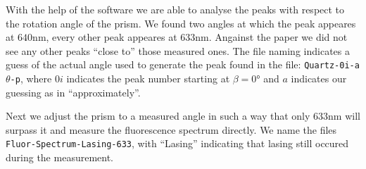 \documentclass[../../main.tex]{subfiles}
\begin{document}
        With the help of the software we are able to analyse the peaks with respect to the rotation angle of the prism. We found two angles at which the peak appeares at $640\si{\nm}$, every other peak appeares at $633\si{\nm}$. Angainst the paper we did not see any other peaks \enquote{close to} those measured ones. The file naming indicates a guess of the actual angle used to generate the peak found in the file: \texttt{Quartz-0i-a}$\theta$\texttt{-p}, where $0i$ indicates the peak number starting at $\beta=0\si{\degree}$ and $a$ indicates our guessing as in \enquote{approximately}. 

        Next we adjust the prism to a measured angle in such a way that only $633\si{\nm}$ will surpass it and measure the fluorescence spectrum directly. We name the files \texttt{Fluor-Spectrum-Lasing-633}, with \enquote{Lasing} indicating that lasing still occured during the measurement.
\end{document}
